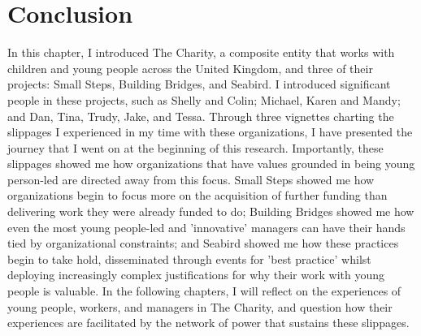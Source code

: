 \section{Conclusion}

In this chapter, I introduced The Charity, a composite entity that works with children and young people across the United Kingdom, and three of their projects: Small Steps, Building Bridges, and Seabird. I introduced significant people in these projects, such as Shelly and Colin; Michael, Karen and Mandy; and Dan, Tina, Trudy, Jake, and Tessa. Through three vignettes charting the slippages I experienced in my time with these organizations, I have presented the journey that I went on at the beginning of this research. Importantly, these slippages showed me how organizations that have values grounded in being young person-led are directed away from this focus. Small Steps showed me how organizations begin to focus more on the acquisition of further funding than delivering work they were already funded to do; Building Bridges showed me how even the most young people-led and 'innovative' managers can have their hands tied by organizational constraints; and Seabird showed me how these practices begin to take hold, disseminated through events for 'best practice' whilst deploying increasingly complex justifications for why their work with young people is valuable. In the following chapters, I will reflect on the experiences of young people, workers, and managers in The Charity, and question how their experiences are facilitated by the network of power that sustains these slippages.
